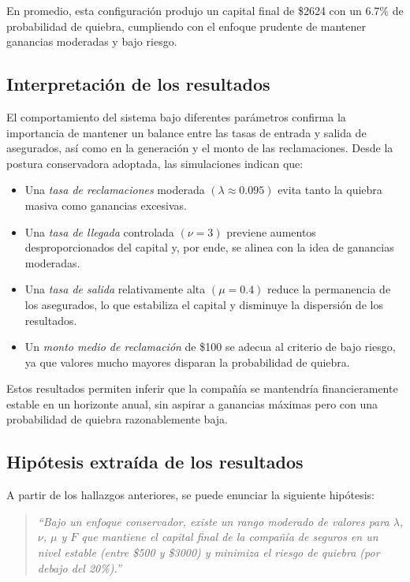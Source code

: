 \documentclass[12pt]{article}
\begin{document}
En promedio, esta configuración produjo un capital final de \$2624 con un 6.7\% de probabilidad de quiebra, cumpliendo con el enfoque prudente de mantener ganancias moderadas y bajo riesgo.

\subsection{Interpretación de los resultados}

El comportamiento del sistema bajo diferentes parámetros confirma la importancia de mantener un balance entre las tasas de entrada y salida de asegurados, así como en la generación y el monto de las reclamaciones. Desde la postura conservadora adoptada, las simulaciones indican que:

\begin{itemize}
    \item Una \emph{tasa de reclamaciones} moderada $(\lambda \approx 0.095)$ evita tanto la quiebra masiva como ganancias excesivas.
    \item Una \emph{tasa de llegada} controlada $(\nu = 3)$ previene aumentos desproporcionados del capital y, por ende, se alinea con la idea de ganancias moderadas.
    \item Una \emph{tasa de salida} relativamente alta $(\mu = 0.4)$ reduce la permanencia de los asegurados, lo que estabiliza el capital y disminuye la dispersión de los resultados.
    \item Un \emph{monto medio de reclamación} de \$100 se adecua al criterio de bajo riesgo, ya que valores mucho mayores disparan la probabilidad de quiebra.
\end{itemize}

Estos resultados permiten inferir que la compañía se mantendría financieramente estable en un horizonte anual, sin aspirar a ganancias máximas pero con una probabilidad de quiebra razonablemente baja.

\subsection{Hipótesis extraída de los resultados}

A partir de los hallazgos anteriores, se puede enunciar la siguiente hipótesis:

\begin{quote}
\emph{``Bajo un enfoque conservador, existe un rango moderado de valores para $\lambda$, $\nu$, $\mu$ y $F$ que mantiene el capital final de la compañía de seguros en un nivel estable (entre \$500 y \$3000) y minimiza el riesgo de quiebra (por debajo del 20\%).''}
\end{quote}
\end{document}
